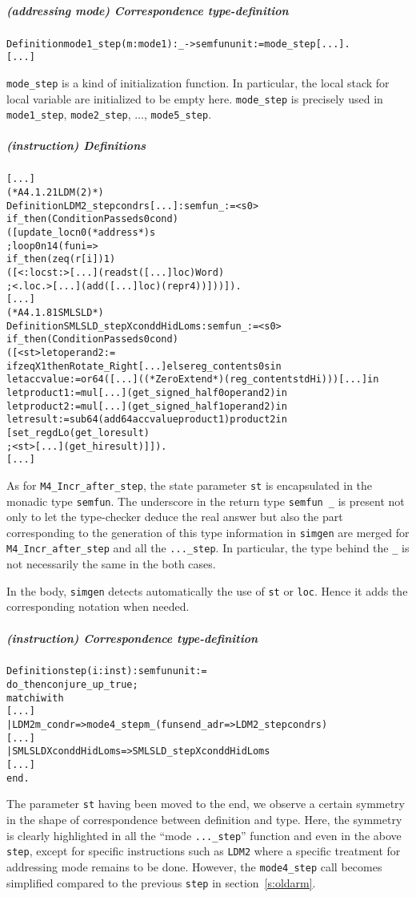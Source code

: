 \documentclass[a4paper, 11pt]{article}
\newenvironment{coq}
  {%
   \begin{alltt}
   \footnotesize} %% 8.3pl2 (April 2011)
  {\end{alltt} %
  }
\newcommand{\simgen}{{\tt simgen}\xspace}
\begin{document}
\subparagraph{(addressing mode) Correspondence type-definition}
\begin{coq}
Definition mode1\_step (m : mode1) : _ -> semfun unit := mode\_step [...].
[...]
\end{coq}
\verb|mode_step| is a kind of initialization function. In particular, the local stack for local variable are initialized to be empty here. \verb|mode_step| is precisely used in \verb|mode1_step|, \verb|mode2_step|, $\dots$, \verb|mode5_step|.

\subparagraph{(instruction) Definitions}
\begin{coq}
[...]
(* A4.1.21 LDM (2) *)
Definition LDM2_step cond r s [...] : semfun _ := <s0>
  if_then (ConditionPassed s0 cond)
    ([ update_loc n0 (*address*) s
    ; loop 0 n14 (fun i => 
         if_then (zeq (r[i]) 1)
           ([ <:loc st:> [...] (read st ([...] loc) Word)
           ; <.loc.> [...] (add ([...] loc) (repr 4)) ])) ]).
[...]
(* A4.1.81 SMLSLD *)
Definition SMLSLD_step X cond dHi dLo m s : semfun _ := <s0>
  if_then (ConditionPassed s0 cond)
    ([ <st> let operand2 := 
              if zeq X 1 then Rotate_Right [...] else reg_content s0 s in
    let accvalue := or64 ([...] ((*ZeroExtend*)(reg_content st dHi))) [...] in
    let product1 := mul [...] (get_signed_half0 operand2) in
    let product2 := mul [...] (get_signed_half1 operand2) in
    let result := sub64 (add64 accvalue product1) product2 in
    [ set_reg dLo (get_lo result)
      ; <st> [...] (get_hi result) ]]).
[...]
\end{coq}
As for \verb|M4_Incr_after_step|, the state parameter \verb|st| is encapsulated in the monadic type \verb|semfun|. The underscore in the return type \verb|semfun _| is present not only to let the type-checker deduce the real answer but also the part corresponding to the generation of this type information in \simgen are merged for \verb|M4_Incr_after_step| and all the \verb|..._step|. In particular, the type behind the \verb|_| is not necessarily the same in the both cases.

In the body, \simgen detects automatically the use of \verb|st| or \verb|loc|. Hence it adds the corresponding notation when needed.
\subparagraph{(instruction) Correspondence type-definition}
\begin{coq}
Definition step (i : inst) : semfun unit :=
  do_then conjure_up_true;
  match i with
[...]
    | LDM2 m_ cond r => mode4_step m_ (fun s end_adr => LDM2_step cond r s)
[...]
    | SMLSLD X cond dHi dLo m s => SMLSLD_step X cond dHi dLo m s
[...]
  end.
\end{coq}
The parameter \verb|st| having been moved to the end, we observe a certain symmetry in the shape of correspondence between definition and type. Here, the symmetry is clearly highlighted in all the ``mode \verb|..._step|'' function and even in the above \verb|step|, except for specific instructions such as \verb|LDM2| where a specific treatment for addressing mode remains to be done. However, the \verb|mode4_step| call becomes simplified compared to the previous \verb|step| in section~\ref{s:oldarm}.
\end{document}
